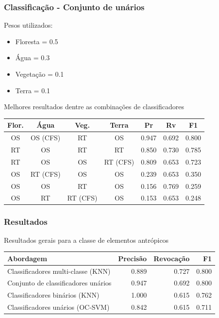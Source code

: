 \documentclass[t]{beamer}
\begin{document}
\begin{frame}[c]
	\frametitle{Classificação - Conjunto de unários}

	Pesos utilizados:
	\begin{itemize}
		\item Floresta = 0.5
		\item Água = 0.3
		\item Vegetação = 0.1
		\item Terra = 0.1
	\end{itemize}

	\centering
	Melhores resultados dentre as combinações de classificadores

	\small{
		\begin{table}[h]
		\centering
		\begin{tabulary}{\linewidth}{|C|C|C|C|C|C|C|}
		\hline
		\textbf{Flor.} & \textbf{Água} & \textbf{Veg.} & \textbf{Terra} & \textbf{Pr} & \textbf{Rv} & \textbf{F1} \\ \hline
		OS & OS (CFS) & RT       & OS       & 0.947 & 0.692 & 0.800 \\ \hline
		RT & OS       & RT       & RT       & 0.850 & 0.730 & 0.785 \\ \hline
		RT & OS       & OS       & RT (CFS) & 0.809 & 0.653 & 0.723 \\ \hline
		OS & RT (CFS) & OS       & OS       & 0.239 & 0.653 & 0.350 \\ \hline
		OS & OS       & RT       & OS       & 0.156 & 0.769 & 0.259 \\ \hline
		OS & RT       & RT (CFS) & OS       & 0.153 & 0.653 & 0.248 \\ \hline
		\end{tabulary}
		\end{table}
	}

\end{frame}

\begin{frame}[c]
	\frametitle{Resultados}
	
	\centering
	Resultados gerais para a classe de elementos antrópicos

	\small{
		\begin{table}[h]
		\centering
		\begin{tabulary}{\linewidth}{|L|R|R|R|}
		\hline
		\textbf{Abordagem}  & \textbf{Precisão} & \textbf{Revocação} & \textbf{F1} \\ \hline
		Classificadores multi-classe (KNN)   & 0.889 & 0.727 & 0.800 \\ \hline
		Conjunto de classificadores unários  & 0.947 & 0.692 & 0.800 \\ \hline
		Classificadores binários (KNN)       & 1.000 & 0.615 & 0.762 \\ \hline
		Classificadores unários (OC-SVM)     & 0.842 & 0.615 & 0.711 \\ \hline
		\end{tabulary}
		\end{table}
	}
\end{frame}
\end{document}
